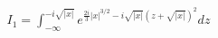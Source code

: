 \documentclass[preview]{standalone}
\begin{document}
\begin{align*}
I_1=\displaystyle \int_{-\infty}^{-i\sqrt{|x|}}e^{\frac{2i}{3}|x|^{3/2}-i\sqrt{|x|}(z+\sqrt{|x|})^2}dz
\end{align*}
\end{document}
